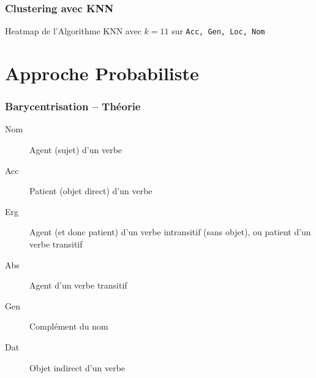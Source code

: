 \documentclass[noamsthm]{beamercours}
\begin{document}
\begin{frame}
\frametitle{Clustering avec KNN}\label{subsub:knn}
\begin{table}
	\centering
	\pgfplotsset{colormap/jet}
	\caption{Heatmap de l'Algorithme KNN avec $k = 11$ sur \texttt{Acc, Gen, Loc, Nom}}
	\label{tab_knn}
\end{table}
\end{frame}

\section{Approche Probabiliste}\label{sec:probas}
\begin{frame}
\frametitle{Barycentrisation -- Théorie}\label{subsec:bary}
\begin{description}
		\item[Nom] Agent (sujet) d'un verbe
		\item[Acc] Patient (objet direct) d'un verbe
		\item[Erg] Agent (et donc patient) d'un verbe intransitif (sans objet), ou patient d'un verbe transitif
		\item[Abs] Agent d'un verbe transitif
		\item[Gen] Complément du nom
		\item[Dat] Objet indirect d'un verbe
	\end{description}

\end{frame}
\end{document}
